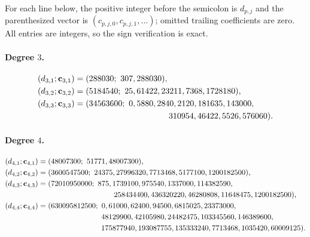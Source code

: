 \documentclass[11pt]{article}
\begin{document}
For each line below, the positive integer before the semicolon is
$d_{p,j}$ and the parenthesized vector is
$(c_{p,j,0},c_{p,j,1},\ldots)$; omitted trailing coefficients are zero.
All entries are integers, so the sign verification is exact.

\begingroup\scriptsize
\allowdisplaybreaks
\paragraph{Degree $3$.}
\begin{align*}
(d_{3,1};\mathbf c_{3,1})={}&(288030;\ 307,288030),\\
(d_{3,2};\mathbf c_{3,2})={}&(5184540;\ 25,61422,23211,7368,1728180),\\
(d_{3,3};\mathbf c_{3,3})={}&(34563600;\ 0,5880,2840,2120,181635,143000,\\
&\hspace{35mm}310954,46422,5526,576060).
\end{align*}

\paragraph{Degree $4$.}
\begin{align*}
(d_{4,1};\mathbf c_{4,1})={}&(48007300;\ 51771,48007300),\\
(d_{4,2};\mathbf c_{4,2})={}&(3600547500;\ 24375,27996320,7713468,5177100,1200182500),\\
(d_{4,3};\mathbf c_{4,3})={}&(72010950000;\ 875,1739100,975540,1337000,114382590,\\
&\hspace{31mm}258434400,436320220,46280808,11648475,1200182500),\\
(d_{4,4};\mathbf c_{4,4})={}&(630095812500;\ 0,61000,62400,94500,6815025,23373000,\\
&\hspace{25mm}48129900,42105980,24482475,103345560,146389600,\\
&\hspace{25mm}175877940,193087755,135333240,7713468,1035420,60009125).
\end{align*}
\end{document}
